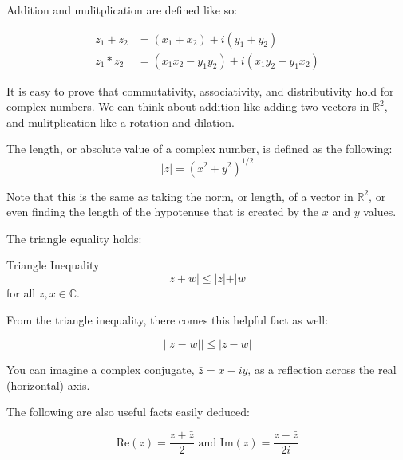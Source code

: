 \documentclass[12pt]{article}
\begin{document}
Addition and mulitplication are defined like so:

\begin{align*}
  z_1+z_2 &= (x_1+x_2)+i(y_1+y_2) \\
  z_1 * z_2 &= (x_1x_2 - y_1y_2) + i (x_1y_2+y_1x_2)
\end{align*}

It is easy to prove that commutativity, associativity, and distributivity hold for complex numbers. 
We can think about addition like adding two vectors in $\mathbb{R}^2$, and mulitplication like 
a rotation and dilation.

\begin{definition}
  The length, or absolute value of a complex number, is defined as the following:
  \begin{equation*}
    \vert z \vert = (x^2 + y^2)^{1/2}
  \end{equation*}
\end{definition}

Note that this is the same as taking the norm, or length, of a vector in $\mathbb{R}^2$, or even 
finding the length of the hypotenuse that is created by the $x$ and $y$ values.

\par The triangle equality holds: 

\begin{theorem}{Triangle Inequality}
  \begin{equation*}
    \vert z + w \vert \leq \vert z \vert + \vert w \vert
  \end{equation*}
  for all $z,x \in \mathbb{C}$.
\end{theorem}

From the triangle inequality, there comes this helpful fact as well:

\begin{fact}
  \begin{equation*}
    \vert \vert z \vert - \vert w \vert \vert \leq \vert z - w \vert 
  \end{equation*}
\end{fact}

You can imagine a complex conjugate, $\bar{z} = x - iy$, as a reflection across the real (horizontal) axis.

\par The following are also useful facts easily deduced:

\begin{fact}
  \begin{equation*}
    \text{Re} (z) = \frac{z+\bar{z}}{2} \text{ and } \text{Im} (z) = \frac{z-\bar{z}}{2i}
  \end{equation*}
\end{fact}
\end{document}
